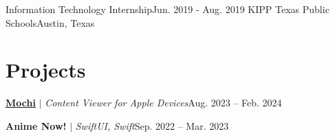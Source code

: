 \documentclass[letterpaper,11pt]{article}
\newif\ifwebdev
\newif\ifmobile
\begin{document}
    \resumeSubheading
      {Information Technology Internship}{Jun. 2019 - Aug. 2019}
      {KIPP Texas Public Schools}{Austin, Texas}
      \resumeItemListStart
      \resumeItemListEnd
  \resumeSubHeadingListEnd

\section{Projects}
    \resumeSubHeadingListStart
      \resumeProjectHeading
        {\href{https://erikb.dev/showcase/mochi}{\underline{\textbf{Mochi}}} $|$ \emph{Content Viewer for Apple Devices}}{Aug. 2023 -- Feb. 2024}
        \resumeItemListStart
          \ifmobile
            \resumeItem{Designed and developed iOS and macOS application using Swift 5.9, SwiftUI, and The Composable Architecture.}
            \resumeItem{Implemented modular-based source system, allowing users to extend the functionality of the application.}
            \resumeItem{Facilitated releases on TestFlight and utilized GitHub for issues reporting.}
          \else
            \ifwebdev
            \else
              \item {}
            \fi
          \fi
          \ifwebdev
            \resumeItem{Developed using Next.js, MDX, TypeScript, and Tailwind CSS.}
            \resumeItem{Built a custom documentation page to help users easily navigate and understand how to use the app.}
            \resumeItem{Focused on creating an intuitive user interface while ensuring a seamless browsing experience.}
          \else
            \ifmobile
            \else
              \item {}
            \fi
          \fi
        \resumeItemListEnd

      \ifmobile
        \resumeProjectHeading
          {\textbf{Anime Now!} $|$ \emph{SwiftUI, Swift}}{Sep. 2022 -- Mar. 2023}
          \resumeItemListStart
          \resumeItemListEnd
\end{document}
